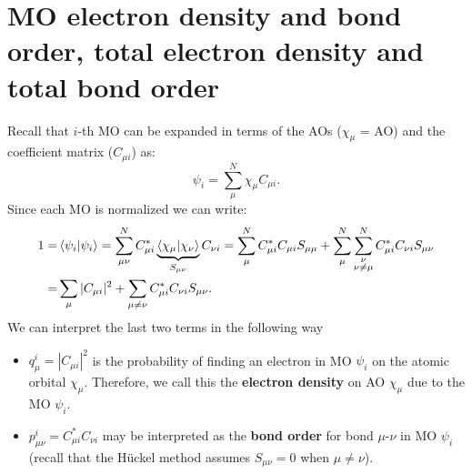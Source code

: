 \documentclass[../Main/chem532-notes.tex]{subfiles}
\begin{document}
\section{MO electron density and bond order, total electron density and total bond order}
Recall that $i$-th MO can be expanded in terms of the AOs ($\chi_\mu$ = AO) and the coefficient matrix ($C_{\mu i}$) as:
\begin{equation}
\psi_i = \sum_\mu^{N} \chi_\mu C_{\mu i}.
\end{equation}
Since each MO is normalized we can write:
\begin{equation}
\begin{split}
1 = & \braket{\psi_i | \psi_i} = 
\sum_{\mu \nu}^N C_{\mu i}^*  \underbrace{\braket{\chi_\mu | \chi_\nu}}_{S_{\mu\nu}} C_{\nu i}
= \sum_{\mu}^N C_{\mu i}^* C_{\mu i}  S_{\mu\mu}
+ \sum_{\mu}^N \sum_{\substack{\nu\\ \nu \neq \mu}}^N C_{\mu i}^* C_{\nu i}  S_{\mu\nu} \\
= & \sum_{\mu} |C_{\mu i}|^2 + \sum_{\mu \neq \nu} C_{\mu i}^* C_{\nu i}  S_{\mu\nu}.
\end{split}
\end{equation}
We can interpret the last two terms in the following way
\begin{itemize}
\item $q^i_\mu = |C_{\mu i}|^2$ is the probability of finding an electron in MO $\psi_i$ on the atomic orbital $\chi_\mu$. Therefore, we call this the \textbf{electron density} on AO $\chi_\mu$ due to the MO $\psi_i$.

\item $p_{\mu \nu}^i = C_{\mu i}^* C_{\nu i}$ may be interpreted as the \textbf{bond order} for bond $\mu$-$\nu$ in MO $\psi_i$ (recall that the H\"{u}ckel method assumes $S_{\mu\nu} = 0$ when $\mu \neq \nu$).
\end{itemize}
\end{document}

